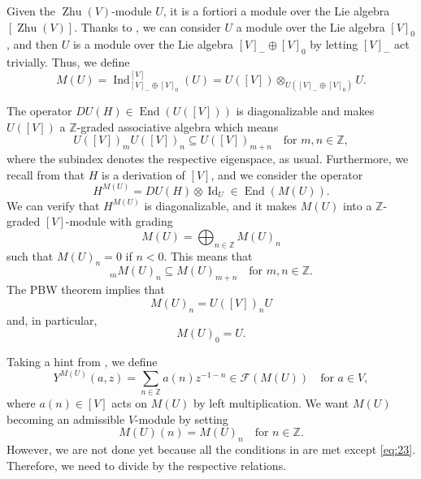 \documentclass[a4paper, 12pt, reqno]{amsart}
\theoremstyle{remark}
\numberwithin{equation}{subsection}
\DeclareMathOperator{\Id}{Id}
\DeclareMathOperator{\End}{End}
\DeclareMathOperator{\Ind}{Ind}
\DeclareMathOperator{\Zhu}{Zhu}
\begin{document}
Given the $\Zhu(V)$-module $U$, it is a fortiori a module over the Lie algebra $[\Zhu(V)]$.
Thanks to , we can consider $U$ a module over the Lie algebra $[V]_0$, and then $U$ is a module over the Lie algebra $[V]_- \oplus [V]_0$ by letting $[V]_-$ act trivially.
Thus, we define
\begin{equation*}
  M(U) = \Ind^{[V]}_{[V]_- \oplus [V]_0}(U) = U([V]) \otimes_{U([V]_- \oplus [V]_0)} U.
\end{equation*}

The operator $DU(H) \in \End(U([V]))$ is diagonalizable and makes $U([V])$ a $\mathbb{Z}$-graded associative algebra which means
\begin{equation*}
  U([V])_mU([V])_n \subseteq U([V])_{m + n} \quad \text{for }m, n \in \mathbb{Z},
\end{equation*}
where the subindex denotes the respective eigenspace, as usual.
Furthermore, we recall from  that $H$ is a derivation of $[V]$, and we consider the operator
\begin{equation*}
  H^{M(U)} = DU(H) \otimes \Id_U \in \End(M(U)).
\end{equation*}
We can verify that $H^{M(U)}$ is diagonalizable, and it makes $M(U)$ into a $\mathbb{Z}$-graded $[V]$-module with grading
\begin{equation*}
  M(U) = \bigoplus_{n \in \mathbb{Z}}M(U)_n
\end{equation*}
such that $M(U)_n = 0$ if $n < 0$.
This means that
\begin{equation*}
  [V]_mM(U)_n \subseteq M(U)_{m + n} \quad \text{for }m, n \in \mathbb{Z}.
\end{equation*}
The PBW theorem implies that
\begin{equation*}
  M(U)_n = U([V])_nU
\end{equation*}
and, in particular,
\begin{equation*}
  M(U)_0 = U.
\end{equation*}

Taking a hint from , we define
\begin{equation*}
  Y^{M(U)}(a, z) = \sum_{n \in \mathbb{Z}}a(n)z^{-1 - n} \in \mathcal{F}(M(U)) \quad \text{for }a \in V,
\end{equation*}
where $a(n) \in [V]$ acts on $M(U)$ by left multiplication.
We want $M(U)$ becoming an admissible $V$-module by setting
\begin{equation*}
  M(U)(n) = M(U)_n \quad \text{for }n \in \mathbb{Z}.
\end{equation*}
However, we are not done yet because all the conditions in  are met except \eqref{eq:23}.
Therefore, we need to divide by the respective relations.
\end{document}
